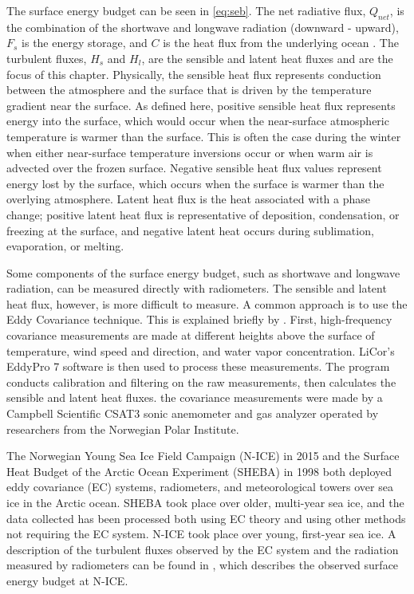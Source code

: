 The surface energy budget can be seen in \ref{eq:seb}. The net radiative flux, $Q_{net}$, is the combination of the shortwave and longwave radiation (downward - upward), $F_{s}$ is the energy storage, and $C$ is the heat flux from the underlying ocean \citep{walden:2017}. The turbulent fluxes, $H_{s}$ and $H_{l}$, are the sensible and latent heat fluxes and are the focus of this chapter. Physically, the sensible heat flux represents conduction between the atmosphere and the surface that is driven by the temperature gradient near the surface. As defined here, positive sensible heat flux represents energy into the surface, which would occur when the near-surface atmospheric temperature is warmer than the surface. This is often the case during the winter when either near-surface temperature inversions occur or when warm air is advected over the frozen surface. Negative sensible heat flux values represent energy lost by the surface, which occurs when the surface is warmer than the overlying atmosphere. Latent heat flux is the heat associated with a phase change; positive latent heat flux is representative of deposition, condensation, or freezing at the surface, and negative latent heat occurs during sublimation, evaporation, or melting.

Some components of the surface energy budget, such as shortwave and longwave radiation, can be measured directly with radiometers. The sensible and latent heat flux, however, is more difficult to measure. A common approach is to use the Eddy Covariance technique. This is explained briefly by \citet{walden:2017}. First, high-frequency covariance measurements are made at different heights above the surface of temperature, wind speed and direction, and water vapor concentration. LiCor's EddyPro 7 \citep{epro} software is then used to process these measurements. The program conducts calibration and filtering on the raw measurements, then calculates the sensible and latent heat fluxes. the covariance measurements were made by a Campbell Scientific CSAT3 sonic anemometer and gas analyzer operated by researchers from the Norwegian Polar Institute. 

The Norwegian Young Sea Ice Field Campaign (N-ICE) in 2015 and the Surface Heat Budget of the Arctic Ocean Experiment (SHEBA) in 1998 both deployed eddy covariance (EC) systems, radiometers, and meteorological towers over sea ice in the Arctic ocean. SHEBA took place over older, multi-year sea ice, and the data collected has been processed both using EC theory and using other methods not requiring the EC system. N-ICE took place over young, first-year sea ice. A description of the turbulent fluxes observed by the EC system and the radiation measured by radiometers can be found in \citet{walden:2017}, which describes the observed surface energy budget at N-ICE. 

